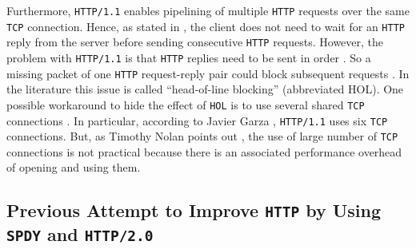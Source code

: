 \documentclass[12pt,a4paper,twoside,openright]{report}
\begin{document}
Furthermore, \texttt{HTTP/1.1} enables pipelining of multiple \texttt{HTTP} requests over the same \texttt{TCP} connection.
Hence, as stated in \cite{bib_digital_ocean_http11_vs_http2}, the client does not need to wait for an \texttt{HTTP} reply from the server before sending consecutive \texttt{HTTP} requests.
However, the problem with \texttt{HTTP/1.1} is that \texttt{HTTP} replies need to be sent in order \cite{RFC7540}. So a missing packet of one \texttt{HTTP} request-reply pair could block subsequent requests \cite{bib_digital_ocean_http11_vs_http2}.
In the literature this issue is called \enquote{head-of-line blocking} (abbreviated HOL).
One possible workaround to hide the effect of \texttt{HOL} is to use several shared \texttt{TCP} connections \cite{bib_digital_ocean_http11_vs_http2}.
In particular, according to Javier Garza \cite{bib_will-http2-make-my-site-faster}, \texttt{HTTP/1.1} uses six \texttt{TCP} connections.
But, as Timothy Nolan points out \cite{bib_digital_ocean_http11_vs_http2}, the use of large number of \texttt{TCP} connections is not practical because there is an associated performance overhead of opening and using them.



\subsection{Previous Attempt to Improve \texttt{HTTP} by Using \texttt{SPDY} and \texttt{HTTP/2.0}} \label{Previous_attempt_to_improve_http_by_using_SPDY_and_HTTP2}
\end{document}
